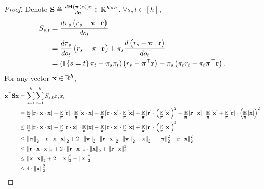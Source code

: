 \begin{proof}
    Denote ${\mathbf{S}} \triangleq \frac{d {\mathbf{H}}\left( {\boldsymbol{\pi}} \left({\mathbf{o}} \right) \right) {\mathbf{r}}}{d {\mathbf{o}} } \in {\mathbb{R}}^{h \times h}$. $\forall s, t \in [h]$,
\begin{equation*}
\begin{split}
    S_{s, t} &= \frac{d \pi_{s} \left( r_{s} - {\boldsymbol{\pi}}^\top {\mathbf{r}} \right) }{d o_{t}} \\
    &= \frac{d \pi_{s} }{d o_{t}} \left( r_{s} - {\boldsymbol{\pi}}^\top {\mathbf{r}} \right) + \pi_{s} \frac{d \left( r_{s} - {\boldsymbol{\pi}}^\top {\mathbf{r}} \right) }{d o_{t}} \\
    &=\left ( {\mathbb{I}}\left\{ s = t\right\} \pi_{t} -  \pi_{s } \pi_{t} \right) \left( r_{s} - {\boldsymbol{\pi}}^\top {\mathbf{r}} \right) - \pi_{s} \left( \pi_{t} r_{t} - \pi_{t} {\boldsymbol{\pi}}^\top {\mathbf{r}} \right).
\end{split}
\end{equation*}
For any vector ${\mathbf{x}} \in {\mathbb{R}}^h$, 
\begin{equation*}
\begin{split}
    {\mathbf{x}}^\top {\mathbf{S}} {\mathbf{x}} &= \sum\limits_{s=1}^{h}{ \sum\limits_{t=1}^{h}{ S_{s,t} x_s x_t} } \\
    &= \operatorname*{{\mathbb{E}}}\limits_{{\boldsymbol{\pi}}}\left[ {\mathbf{r}} \cdot {\mathbf{x}} \cdot {\mathbf{x}} \right] - \operatorname*{{\mathbb{E}}}\limits_{{\boldsymbol{\pi}}}\left[ {\mathbf{r}} \right] \cdot \operatorname*{{\mathbb{E}}}\limits_{{\boldsymbol{\pi}}}\left[ {\mathbf{x}} \cdot {\mathbf{x}} \right] - \operatorname*{{\mathbb{E}}}\limits_{{\boldsymbol{\pi}}}\left[ {\mathbf{r}} \cdot {\mathbf{x}} \right] \cdot \operatorname*{{\mathbb{E}}}\limits_{{\boldsymbol{\pi}}}\left[ {\mathbf{x}} \right] + \operatorname*{{\mathbb{E}}}\limits_{{\boldsymbol{\pi}}}\left[ {\mathbf{r}} \right] \cdot \left( \operatorname*{{\mathbb{E}}}\limits_{{\boldsymbol{\pi}}}\left[ {\mathbf{x}} \right] \right)^2  - \operatorname*{{\mathbb{E}}}\limits_{{\boldsymbol{\pi}}}\left[ {\mathbf{r}} \cdot {\mathbf{x}} \right] \cdot \operatorname*{{\mathbb{E}}}\limits_{{\boldsymbol{\pi}}}\left[ {\mathbf{x}} \right] + \operatorname*{{\mathbb{E}}}\limits_{{\boldsymbol{\pi}}}\left[ {\mathbf{r}} \right] \cdot \left( \operatorname*{{\mathbb{E}}}\limits_{{\boldsymbol{\pi}}}\left[ {\mathbf{x}} \right] \right)^2 \\
    &\le \operatorname*{{\mathbb{E}}}\limits_{{\boldsymbol{\pi}}}\left[ {\mathbf{r}} \cdot {\mathbf{x}} \cdot {\mathbf{x}} \right] - \operatorname*{{\mathbb{E}}}\limits_{{\boldsymbol{\pi}}}\left[ {\mathbf{r}} \cdot {\mathbf{x}} \right] \cdot \operatorname*{{\mathbb{E}}}\limits_{{\boldsymbol{\pi}}}\left[ {\mathbf{x}} \right] - \operatorname*{{\mathbb{E}}}\limits_{{\boldsymbol{\pi}}}\left[ {\mathbf{r}} \cdot {\mathbf{x}} \right] \cdot \operatorname*{{\mathbb{E}}}\limits_{{\boldsymbol{\pi}}}\left[ {\mathbf{x}} \right] + \operatorname*{{\mathbb{E}}}\limits_{{\boldsymbol{\pi}}}\left[ {\mathbf{r}} \right] \cdot \left( \operatorname*{{\mathbb{E}}}\limits_{{\boldsymbol{\pi}}}\left[ {\mathbf{x}} \right] \right)^2 \\
    &\le \left\| {\boldsymbol{\pi}} \right\|_2 \cdot \left\| {\mathbf{r}} \cdot {\mathbf{x}} \cdot {\mathbf{x}} \right\|_2 + 2 \cdot \left\| {\boldsymbol{\pi}} \right\|_2 \cdot \left\| {\mathbf{r}} \cdot {\mathbf{x}} \right\|_2 \cdot \left\| {\boldsymbol{\pi}} \right\|_2 \cdot \left\| {\mathbf{x}} \right\|_2 + \left\| {\boldsymbol{\pi}} \right\|_2^2 \cdot \left\| {\mathbf{r}} \cdot {\mathbf{x}} \right\|_2^2 \\
    &\le \left\| {\mathbf{r}} \cdot {\mathbf{x}} \cdot {\mathbf{x}} \right\|_2 + 2 \cdot \left\| {\mathbf{r}} \cdot {\mathbf{x}} \right\|_2 \cdot \left\| {\mathbf{x}} \right\|_2 + \left\| {\mathbf{r}} \cdot {\mathbf{x}} \right\|_2^2 \\
    &\le \left\| {\mathbf{x}} \cdot {\mathbf{x}} \right\|_2 + 2 \cdot \left\| {\mathbf{x}} \right\|_2^2 + \left\| {\mathbf{x}} \right\|_2^2 \\
    &\le 4 \cdot \left\| {\mathbf{x}} \right\|_2^2. \qedhere
\end{split}
\end{equation*}
\end{proof}


